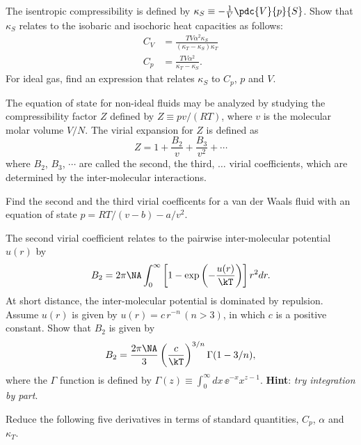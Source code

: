 The isentropic compressibility is defined by $\kappa_S \equiv -\frac{1}{V}\pdc{V}{p}{S}$.
Show that $\kappa_S$ relates to the isobaric and isochoric heat capacities as follows:
\begin{align*}
C_V &= \frac{TV\alpha^2 \kappa_S}{(\kappa_T - \kappa_S)\kappa_T}  \\
C_p &= \frac{TV\alpha^2}{\kappa_T - \kappa_S} .
\end{align*}
For ideal gas, find an expression that relates $\kappa_S$ to $C_p$, $p$ and $V$.

\bigskip
{}
The equation of state for non-ideal fluids may be analyzed by studying
the compressibility factor $Z$ defined by $Z\equiv pv/(RT)$,
where $v$ is the molecular molar volume $V/N$.
The virial expansion for $Z$ is defined as
$$Z = 1 + \frac{B_2}{v} + \frac{B_3}{v^2} + \cdots$$
where $B_2$, $B_3$, $\cdots$ are called the second, the third,
$\ldots$ virial coefficients, which are determined by the inter-molecular interactions.

\smallskip
\subp
Find the second and the third virial coefficents for a van der Waals fluid with an equation of state 
$p = RT/(v - b) - a / v^2$.

\smallskip
\subp
The second virial coefficient relates to the pairwise inter-molecular potential $u(r)$ by
$$ B_2 = 2\pi \NA \int_0^\infty\left[1 - \exp\left(-\frac{u(r)}{\kT}\right)\right] r^2 dr. $$
At short distance, the inter-molecular potential is dominated by repulsion.
Assume $u(r)$ is given by $u(r) = c\, r^{-n} \, (n>3)$, in which $c$ is a positive constant.
Show that $B_2$ is given by
\begin{equation*}
B_2 = \frac{2\pi \NA}{3} \left(\frac{c}{\kT}\right)^{3/n} \Gamma(1-3/n),
\end{equation*}
where the $\Gamma$ function is defined by
$\Gamma(z) \equiv \int_{0}^\infty\!dx\, \ee^{-x} x^{z-1} $.
{\bf Hint}: {\sl try integration by part}.

\bigskip
{}
Reduce the following five derivatives in terms of standard quantities,
$C_p$, $\alpha$ and $\kappa_T$.

